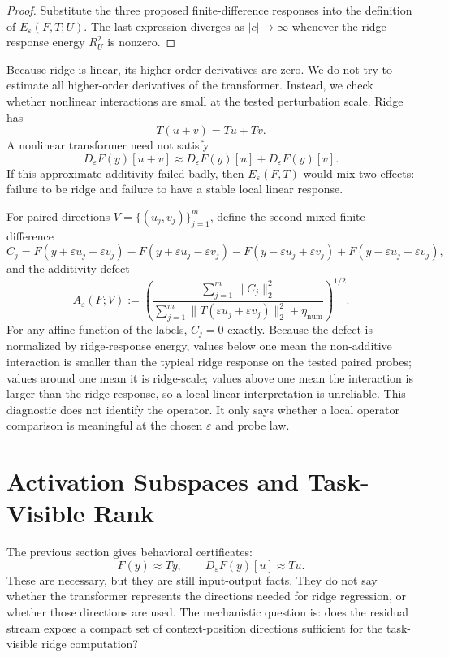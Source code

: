 \documentclass[11pt]{article}
\begin{document}
\begin{proof}
Substitute the three proposed finite-difference responses into the definition of
\(E_\varepsilon(F,T;U)\). The last expression diverges as \(|c|\to\infty\) whenever the ridge
response energy \(R_U^2\) is nonzero.
\end{proof}

Because ridge is linear, its higher-order derivatives are zero. We do not try to estimate all
higher-order derivatives of the transformer. Instead, we check whether nonlinear interactions are
small at the tested perturbation scale. Ridge has
\[
T(u+v)=Tu+Tv.
\]
A nonlinear transformer need not satisfy
\[
D_\varepsilon F(y)[u+v]\approx D_\varepsilon F(y)[u]+D_\varepsilon F(y)[v].
\]
If this approximate additivity failed badly, then \(E_\varepsilon(F,T)\) would mix two effects:
failure to be ridge and failure to have a stable local linear response.

For paired directions \(V=\{(u_j,v_j)\}_{j=1}^m\), define the second mixed finite difference
\[
C_j =
F(y+\varepsilon u_j+\varepsilon v_j)
-F(y+\varepsilon u_j-\varepsilon v_j)
-F(y-\varepsilon u_j+\varepsilon v_j)
+F(y-\varepsilon u_j-\varepsilon v_j),
\]
and the additivity defect
\[
A_\varepsilon(F;V)
:=
\left(
\frac{
\sum_{j=1}^m\|C_j\|_2^2
}{
\sum_{j=1}^m\|T(\varepsilon u_j+\varepsilon v_j)\|_2^2+\eta_{\mathrm{num}}
}
\right)^{1/2}.
\]
For any affine function of the labels, \(C_j=0\) exactly. Because the defect is normalized by
ridge-response energy, values below one mean the non-additive interaction is smaller than the
typical ridge response on the tested paired probes; values around one mean it is ridge-scale; values
above one mean the interaction is larger than the ridge response, so a local-linear interpretation is
unreliable. This diagnostic does not identify the operator. It only says whether a local operator
comparison is meaningful at the chosen \(\varepsilon\) and probe law.

\section{Activation Subspaces and Task-Visible Rank}

The previous section gives behavioral certificates:
\[
F(y)\approx Ty,\qquad D_\varepsilon F(y)[u]\approx Tu.
\]
These are necessary, but they are still input-output facts. They do not say whether the transformer
represents the directions needed for ridge regression, or whether those directions are used. The
mechanistic question is: does the residual stream expose a compact set of context-position
directions sufficient for the task-visible ridge computation?
\end{document}
